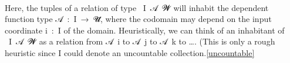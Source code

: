\begin{code}%
\>[0]\AgdaSpace{}%
\AgdaSymbol{:}\AgdaSpace{}%
\AgdaSymbol{(}\AgdaSpace{}%
\AgdaSymbol{:}\AgdaSpace{}%
\AgdaSpace{}%
\AgdaSymbol{)}\AgdaSpace{}%
\AgdaSpace{}%
\AgdaSymbol{(}\AgdaSpace{}%
\AgdaSpace{}%
\AgdaSpace{}%
\AgdaSymbol{)}\AgdaSpace{}%
\AgdaSpace{}%
\AgdaSymbol{(}\AgdaSpace{}%
\AgdaSymbol{:}\AgdaSpace{}%
\AgdaSymbol{)}\AgdaSpace{}%
\AgdaSpace{}%
\AgdaSpace{}%
\AgdaSpace{}%
\AgdaSpace{}%
\AgdaSpace{}%
\AgdaSpace{}%
\AgdaSpace{}%
\<%
\\
\>[0]\AgdaSpace{}%
\AgdaSpace{}%
\AgdaSpace{}%
\AgdaSpace{}%
\AgdaSymbol{=}\AgdaSpace{}%
\AgdaSpace{}%
\AgdaSpace{}%
\AgdaSpace{}%
\AgdaSpace{}%
\<%
\end{code}
\ccpad
Here, the tuples of a relation of type ~\ab I~\ab 𝒜~\ab 𝓦 will inhabit the dependent function type \ab 𝒜~\as :~\ab I~\as →~\ab 𝓤\af ̇, where the codomain may depend on the input coordinate \ab i~\as :~\ab I of the domain. Heuristically, we can think of an inhabitant of ~\ab I~\ab 𝒜~\ab 𝓦 as a relation from \ab 𝒜~\ab i to \ab 𝒜~\ab j to \ab 𝒜~\ab k to …. (This is only a rough heuristic since \ab I could denote an uncountable collection.\cref{uncountable}



